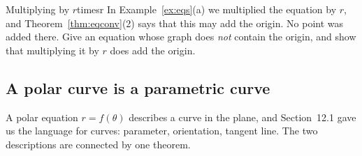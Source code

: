 \documentclass[11pt]{article}
\begin{document}
\begin{think}{Multiplying by $r$}{timesr}
In Example~\ref{ex:eqs}(a) we multiplied the equation by $r$, and Theorem~\ref{thm:eqconv}(2) says that this may add the origin. No point was added there. Give an equation whose graph does \emph{not} contain the origin, and show that multiplying it by $r$ does add the origin.
\end{think}

\subsection*{A polar curve is a parametric curve}

A polar equation $r=f(\theta)$ describes a curve in the plane, and Section~12.1 gave us the language for curves: parameter, orientation, tangent line. The two descriptions are connected by one theorem.
\end{document}
